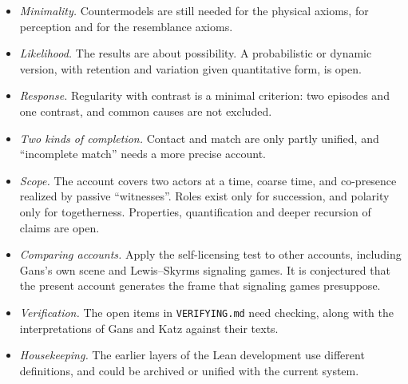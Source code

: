 \documentclass[11pt]{article}
\begin{document}
\begin{itemize}
  \item \emph{Minimality.} Countermodels are still needed for the physical axioms, for
    perception and for the resemblance axioms.
  \item \emph{Likelihood.} The results are about possibility. A probabilistic or dynamic
    version, with retention and variation given quantitative form, is open.
  \item \emph{Response.} Regularity with contrast is a minimal criterion: two episodes and
    one contrast, and common causes are not excluded.
  \item \emph{Two kinds of completion.} Contact and match are only partly unified, and
    ``incomplete match'' needs a more precise account.
  \item \emph{Scope.} The account covers two actors at a time, coarse time, and
    co-presence realized by passive ``witnesses''. Roles exist only for succession, and
    polarity only for togetherness. Properties, quantification and deeper recursion of
    claims are open.
  \item \emph{Comparing accounts.} Apply the self-licensing test to other accounts,
    including Gans's own scene and Lewis--Skyrms signaling games. It is conjectured that the
    present account generates the frame that signaling games presuppose.
  \item \emph{Verification.} The open items in \texttt{VERIFYING.md} need checking, along
    with the interpretations of Gans and Katz against their texts.
  \item \emph{Housekeeping.} The earlier layers of the Lean development use different
    definitions, and could be archived or unified with the current system.
\end{itemize}
\end{document}

